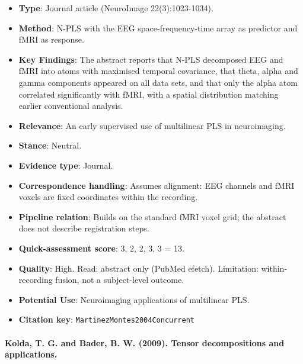 \documentclass[journal,onecolumn]{IEEEtran}
\begin{document}
\begin{itemize}

\item{} \textbf{Type}: Journal article (NeuroImage 22(3):1023-1034).

\item{} \textbf{Method}: N-PLS with the EEG space-frequency-time array as predictor and fMRI as response.

\item{} \textbf{Key Findings}: The abstract reports that N-PLS decomposed EEG and fMRI into atoms with maximised temporal covariance, that theta, alpha and gamma components appeared on all data sets, and that only the alpha atom correlated significantly with fMRI, with a spatial distribution matching earlier conventional analysis.

\item{} \textbf{Relevance}: An early supervised use of multilinear PLS in neuroimaging.

\item{} \textbf{Stance}: Neutral.

\item{} \textbf{Evidence type}: Journal.

\item{} \textbf{Correspondence handling}: Assumes alignment: EEG channels and fMRI voxels are fixed coordinates within the recording.

\item{} \textbf{Pipeline relation}: Builds on the standard fMRI voxel grid; the abstract does not describe registration steps.

\item{} \textbf{Quick-assessment score}: 3, 2, 2, 3, 3 = 13.

\item{} \textbf{Quality}: High. Read: abstract only (PubMed efetch). Limitation: within-recording fusion, not a subject-level outcome.

\item{} \textbf{Potential Use}: Neuroimaging applications of multilinear PLS.

\item{} \textbf{Citation key}: \texttt{MartinezMontes2004Concurrent}

\end{itemize}

\paragraph{Kolda, T. G. and Bader, B. W. (2009). Tensor decompositions and applications.~\cite{Kolda2009Tensor}}\mbox{}
\end{document}
